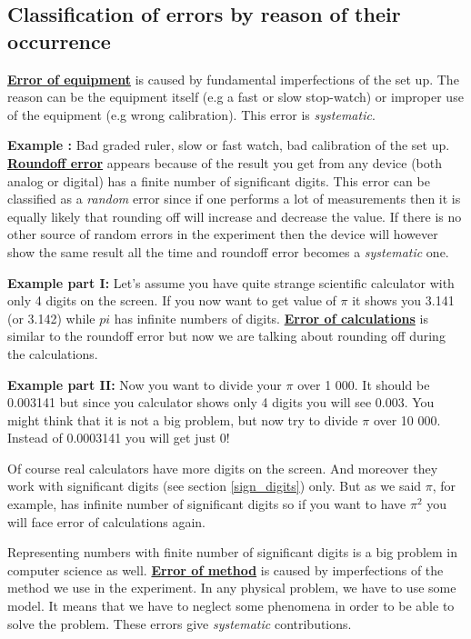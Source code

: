 \documentclass[12pt,a4paper]{article}
\newcommand{\definition}[1]{ \textcolor{MyRed}{\uline{\textbf {#1}}}}%
\newcommand{\example}[1]{\textcolor{MyBlue}{\textbf{Example {#1}: }}}
\begin{document}
\subsection{Classification of errors by reason of their occurrence}
\definition{Error of equipment} is caused by fundamental imperfections of the set up. The reason can be the equipment itself (e.g a fast or slow stop-watch) or improper use of the equipment (e.g wrong calibration). This error is \textit{systematic}.

\example{} Bad graded ruler, slow or fast watch, bad calibration of the set up.
\newline
\newline
\definition{Roundoff error} appears because of the result you get from any device (both analog or digital) has a finite number of significant digits. This error can be classified as a \textit{random} error since if one performs a lot of measurements then it is equally likely that rounding off will increase and decrease the value. If there is no other source of random errors in the experiment then the device will however show the same result all the time and roundoff error becomes a \textit{systematic} one.

\example{part I} Let's assume you have quite strange scientific calculator with only 4 digits on the screen. If you now want to get value of $\pi$ it shows you 3.141 (or 3.142) while $pi$ has infinite numbers of digits.
\newline
\newline
\definition{Error of calculations} is similar to the roundoff error but now we are talking about rounding off during the calculations.

\example{part II} Now you want to divide your $\pi$ over 1 000. It should be 0.003141 but since you calculator shows only 4 digits you will see 0.003. You might think that it is not a big problem, but now try to divide $\pi$ over 10 000. Instead of 0.0003141 you will get just 0!

Of course real calculators have more digits on the screen. And moreover they work with significant digits (see section \ref{sign_digits}) only. But as we said $\pi$, for example, has infinite number of significant digits so if you want to have $\pi^2$ you will face error of calculations again.

Representing numbers with finite number of significant digits is a big problem in computer science as well.
\newline
\newline
\definition{Error of method} is caused by imperfections of the method we use in the experiment. In any physical problem, we have to use some model. It means that we have to neglect some phenomena in order to be able to solve the problem. These errors give \textit{systematic} contributions.
\end{document}
